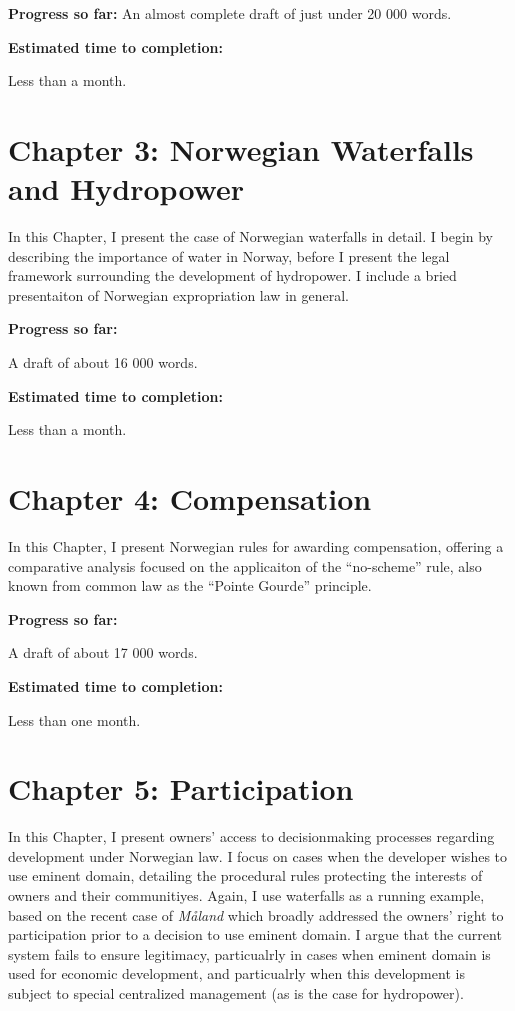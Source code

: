 \documentclass[12pt,a4paper]{article} %
\begin{document}
{\bf Progress so far:}
An almost complete draft of just under 20 000 words.

{\bf Estimated time to completion:}

Less than a month.

\section*{Chapter 3: Norwegian Waterfalls and Hydropower}

In this Chapter, I present the case of Norwegian waterfalls in detail. I begin by describing the importance of water in Norway, before I present the legal framework surrounding the development of hydropower. I include a bried presentaiton of Norwegian expropriation law in general.

{\bf Progress so far:}

A draft of about 16 000 words.

{\bf Estimated time to completion:}

Less than a month.


\section*{Chapter 4: Compensation}

In this Chapter, I present Norwegian rules for awarding compensation, offering a comparative analysis focused on the applicaiton of the ``no-scheme'' rule, also known from common law as the ``Pointe Gourde'' principle. 

{\bf Progress so far:}

A draft of about 17 000 words.

{\bf Estimated time to completion:}

Less than one month.

\section*{Chapter 5: Participation}

In this Chapter, I present owners' access to decisionmaking processes regarding development under Norwegian law. I focus on cases when the developer wishes to use eminent domain, detailing the procedural rules protecting the interests of owners and their communitiyes. Again, I use waterfalls as a running example, based on the recent case of {\it M{\aa}land} which broadly addressed the owners' right to participation prior to a decision to use eminent domain. I argue that the current system fails to ensure legitimacy, particualrly in cases when eminent domain is used for economic development, and particualrly when this development is subject to special centralized management (as is the case for hydropower).
\end{document}
